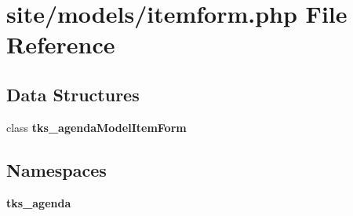 \section{site/models/itemform.php File Reference}
\label{models_2itemform_8php}
\subsection*{Data Structures}
\begin{DoxyCompactItemize}
\item 
class \textbf{ tks\+\_\+agenda\+Model\+Item\+Form}
\end{DoxyCompactItemize}
\subsection*{Namespaces}
\begin{DoxyCompactItemize}
\item 
 \textbf{ tks\+\_\+agenda}
\end{DoxyCompactItemize}
